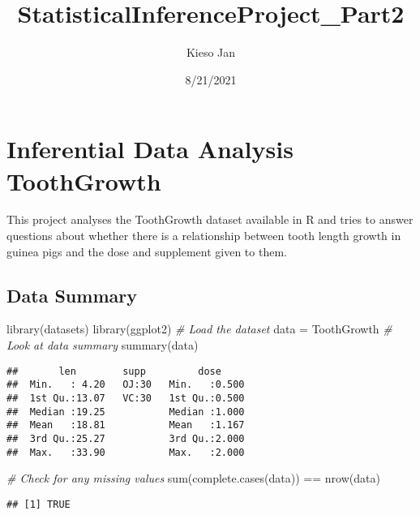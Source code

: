 \documentclass[
]{article}
\title{StatisticalInferenceProject\_Part2}
\author{Kieso Jan}
\date{8/21/2021}
\newenvironment{Shaded}{\begin{snugshade}}{\end{snugshade}}
\newcommand{\CommentTok}[1]{\textcolor[rgb]{0.56,0.35,0.01}{\textit{#1}}}
\newcommand{\FunctionTok}[1]{\textcolor[rgb]{0.00,0.00,0.00}{#1}}
\newcommand{\NormalTok}[1]{#1}
\newcommand{\OtherTok}[1]{\textcolor[rgb]{0.56,0.35,0.01}{#1}}
\newcommand{\SpecialCharTok}[1]{\textcolor[rgb]{0.00,0.00,0.00}{#1}}
\begin{document}
\maketitle

\hypertarget{inferential-data-analysis-toothgrowth}{%
\section{Inferential Data Analysis
ToothGrowth}\label{inferential-data-analysis-toothgrowth}}

This project analyses the ToothGrowth dataset available in R and tries
to answer questions about whether there is a relationship between tooth
length growth in guinea pigs and the dose and supplement given to them.

\hypertarget{data-summary}{%
\subsection{Data Summary}\label{data-summary}}

\begin{Shaded}
\begin{Highlighting}[]
\FunctionTok{library}\NormalTok{(datasets)}
\FunctionTok{library}\NormalTok{(ggplot2)}
\CommentTok{\# Load the dataset}
\NormalTok{data }\OtherTok{=}\NormalTok{ ToothGrowth}
\CommentTok{\# Look at data summary}
\FunctionTok{summary}\NormalTok{(data)}
\end{Highlighting}
\end{Shaded}

\begin{verbatim}
##       len        supp         dose      
##  Min.   : 4.20   OJ:30   Min.   :0.500  
##  1st Qu.:13.07   VC:30   1st Qu.:0.500  
##  Median :19.25           Median :1.000  
##  Mean   :18.81           Mean   :1.167  
##  3rd Qu.:25.27           3rd Qu.:2.000  
##  Max.   :33.90           Max.   :2.000
\end{verbatim}

\begin{Shaded}
\begin{Highlighting}[]
\CommentTok{\# Check for any missing values}
\FunctionTok{sum}\NormalTok{(}\FunctionTok{complete.cases}\NormalTok{(data)) }\SpecialCharTok{==} \FunctionTok{nrow}\NormalTok{(data)}
\end{Highlighting}
\end{Shaded}

\begin{verbatim}
## [1] TRUE
\end{verbatim}
\end{document}

